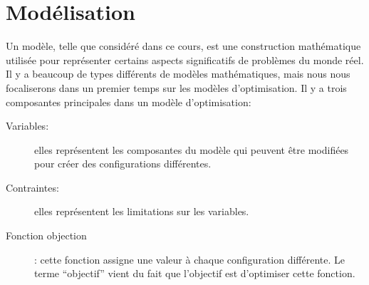 \section{Modélisation}
\label{sec:modeles}

Un modèle, telle que considéré dans ce cours, est une construction mathématique utilisée pour représenter certains aspects significatifs de problèmes du monde réel.
Il y a beaucoup de types différents de modèles mathématiques, mais nous nous focaliserons dans un premier temps sur les modèles d'optimisation.
Il y a trois composantes principales dans un modèle d'optimisation:
\begin{description}
\item[Variables:] elles représentent les composantes du modèle qui peuvent être modifiées pour créer des configurations différentes.
\item[Contraintes:] elles représentent les limitations sur les variables.
\item[Fonction objection]: cette fonction assigne une valeur à chaque configuration différente. Le terme ``objectif'' vient du fait que l'objectif est d'optimiser cette fonction.
\end{description}

